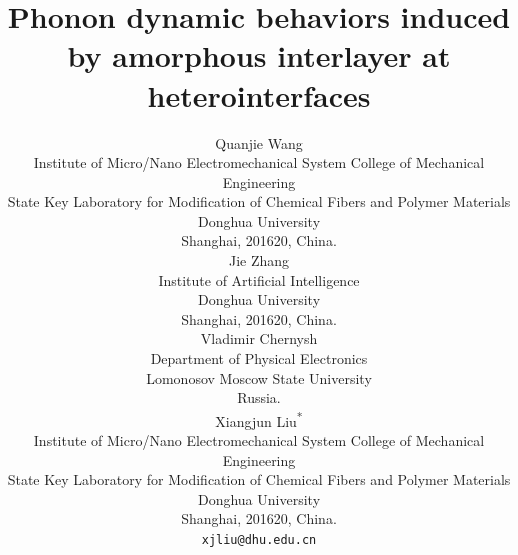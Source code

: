 \documentclass{article}
\begin{document}
\title{Phonon dynamic behaviors induced by amorphous interlayer at heterointerfaces}


\author{ 
        Quanjie Wang\\
        Institute of Micro/Nano Electromechanical System College of Mechanical Engineering\\
        State Key Laboratory for Modification of Chemical Fibers and Polymer Materials Donghua University\\
        Shanghai, 201620, China. \\
	\And
	Jie Zhang\\
	Institute of Artificial Intelligence\\
        Donghua University\\
        Shanghai, 201620, China. \\
        \And
        Vladimir Chernysh \\
	Department of Physical Electronics\\
        Lomonosov Moscow State University\\
        Russia. \\
        \And
        Xiangjun Liu\textsuperscript{*}\\
	Institute of Micro/Nano Electromechanical System College of Mechanical Engineering\\
        State Key Laboratory for Modification of Chemical Fibers and Polymer Materials Donghua University\\
        Shanghai, 201620, China. \\
        \texttt{xjliu@dhu.edu.cn} \\
}
\end{document}
